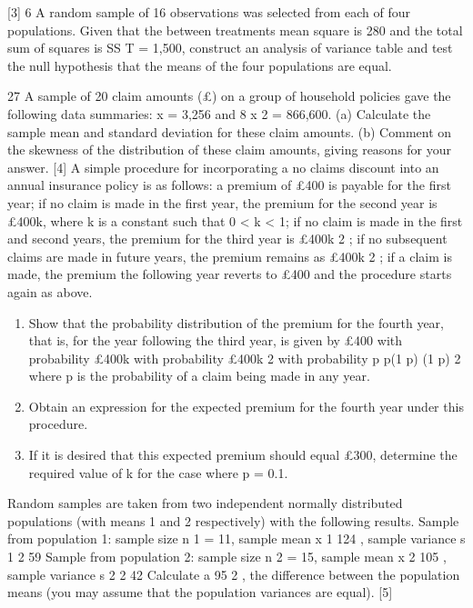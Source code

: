 \documentclass[a4paper,12pt]{article}
\begin{document}
[3]
6
A random sample of 16 observations was selected from each of four populations.
Given that the between treatments mean square is 280 and the total sum of squares is
SS T = 1,500, construct an analysis of variance table and test the null hypothesis that
the means of the four populations are equal.

27
A sample of 20 claim amounts (£) on a group of household policies gave the
following data summaries:
x = 3,256 and
8
x 2 = 866,600.
(a) Calculate the sample mean and standard deviation for these claim amounts.
(b) Comment on the skewness of the distribution of these claim amounts, giving
reasons for your answer.
[4]
A simple procedure for incorporating a no claims discount into an annual insurance
policy is as follows:
a premium of £400 is payable for the first year;
if no claim is made in the first year, the premium for the second year is £400k,
where k is a constant such that 0 < k < 1;
if no claim is made in the first and second years, the premium for the third
year is £400k 2 ;
if no subsequent claims are made in future years, the premium remains as
£400k 2 ;
if a claim is made, the premium the following year reverts to £400 and the
procedure starts again as above.

\begin{enumerate}
\item
Show that the probability distribution of the premium for the fourth year, that
is, for the year following the third year, is given by
£400
with probability
£400k with probability
£400k 2 with probability
p
p(1 p)
(1 p) 2
where p is the probability of a claim being made in any year.

\item  Obtain an expression for the expected premium for the fourth year under this
procedure.

\item If it is desired that this expected premium should equal £300, determine the
required value of k for the case where p = 0.1.
\end{enumerate}

Random samples are taken from two independent normally distributed populations
(with means 1 and 2 respectively) with the following results.
Sample from population 1:
sample size n 1 = 11, sample mean x 1 124 , sample variance s 1 2
59
Sample from population 2:
sample size n 2 = 15, sample mean x 2 105 , sample variance s 2 2
42
Calculate a 95%
2 , the difference between the
population means (you may assume that the population variances are equal).
[5]
\newpage
\end{document}
